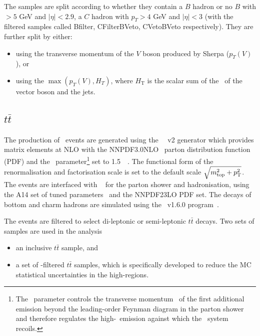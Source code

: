 \par The samples are split according to whether they contain a $B$ hadron or no $B$ with \pt$> 5$ GeV and $|\eta|<2.9$, 
a $C$ hadron with $p_T > 4$ GeV and $|\eta|<3$ (with the filtered samples called Bfilter, CFilterBVeto, CVetoBVeto respectively). 
They are further split by either:

\begin{itemize}
	\item using the transverse momentum of the $V$ boson produced by Sherpa ($p_T(V)$), or
	\item using the $\max(p_T(V), H_T)$, where $\ensuremath{H_{\mathrm{T}}}$ is the scalar sum of the \pt~of the vector boson and the jets.
\end{itemize}%

\subsection{$t\bar{t}$}

\par The production of \ttbar~events are generated using the \powhegbox~\cite{Frixione:2007nw,Nason:2004rx,Frixione:2007vw,Alioli:2010xd}~v2
generator which provides matrix elements at NLO with the NNPDF3.0NLO~\cite{Ball:2014uwa} parton distribution function (PDF) and the \hdamp\ parameter\footnote{The \hdamp\ parameter
controls the transverse momentum \pt\ of the first additional emission beyond the leading-order Feynman diagram
in the parton shower and therefore regulates the  high-\pt\ emission against which the \ttbar\ system recoils.} set to 1.5~\mtop~\cite{ATL-PHYS-PUB-2016-020}.
The functional form of the renormalisation and factorisation scale is set to the default scale $\sqrt{m_{\textrm{top}}^2 + p_{\textrm T}^2}$.
The events are interfaced with \pythia~\cite{Sjostrand:2014zea} for the parton shower and hadronisation,
using the A14 set of tuned parameters~\cite{ATL-PHYS-PUB-2014-021}  and the NNPDF23LO PDF set.
The decays of bottom and charm hadrons are simulated using the \evtgen\ v1.6.0 program~\cite{EvtGen}.

\par The events are filtered to select di-leptonic or semi-leptonic $t\bar{t}$ decays. Two sets of samples are used in the analysis

\begin{itemize}
	\item an inclusive $t\bar{t}$ sample, and
	\item a set of \met-filtered $t\bar{t}$ samples, which is specifically developed to reduce the MC statistical uncertainties in the high-\met regions.
\end{itemize}

